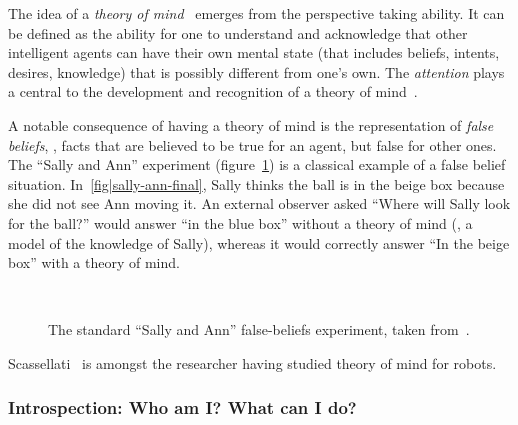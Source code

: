 The idea of a \emph{theory of mind}~\cite{Premack1978} emerges from the
perspective taking ability. It can be defined as the ability for one to
understand and acknowledge that other intelligent agents can have their own
mental state (that includes beliefs, intents, desires, knowledge) that is
possibly different from one's own. The \emph{attention} plays a central to the
development and recognition of a theory of mind~\cite{Baron-Cohen1985,
Leslie2000}.

A notable consequence of having a theory of mind is the representation of
\emph{false beliefs}, \ie, facts that are believed to be true for an agent, but
false for other ones. The ``Sally and Ann'' experiment
(figure~\ref{fig|sally-ann}) is a classical example of a false belief
situation. In~\ref{fig|sally-ann-final}, Sally thinks the ball is in the beige
box because she did not see Ann moving it. An external observer asked ``Where
will Sally look for the ball?'' would answer ``in the blue box'' without a
theory of mind (\ie, a model of the knowledge of Sally), whereas it would
correctly answer ``In the beige box'' with a theory of mind.

\begin{figure}
        \centering
         \hspace{15pt} %
         \\
         \hspace{15pt} %
        \caption{The standard ``Sally and Ann'' false-beliefs experiment, taken
        from~\cite{Leslie2000}.}

        \label{fig|sally-ann}
\end{figure}

Scassellati~\cite{Scassellati2002} is amongst the researcher having studied
theory of mind for robots.



\subsubsection{Introspection: Who am I? What can I do?}
\label{sect|introspection}

